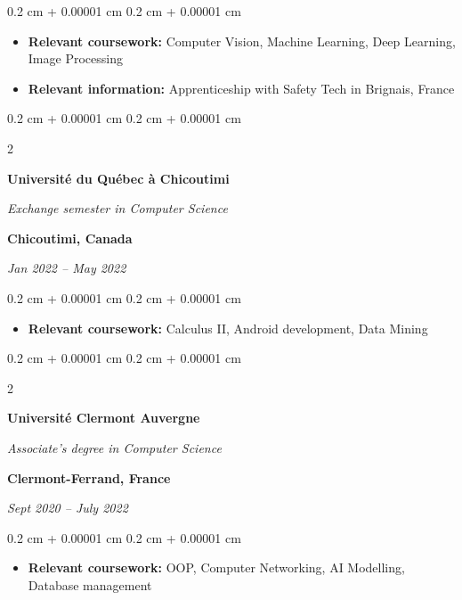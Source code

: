 \documentclass[10pt, letterpaper]{article}
\newenvironment{highlights}{
    \begin{itemize}[
        topsep=0.10 cm,
        parsep=0.10 cm,
        partopsep=0pt,
        itemsep=0pt,
        leftmargin=0.4 cm + 10pt
    ]
}{
    \end{itemize}
} %
\newenvironment{onecolentry}{
    \begin{adjustwidth}{
        0.2 cm + 0.00001 cm
    }{
        0.2 cm + 0.00001 cm
    }
}{
    \end{adjustwidth}
} %
\newenvironment{twocolentry}[2][]{
    \onecolentry
    \def\secondColumn{#2}
    \setcolumnwidth{\fill, 6 cm}
    \begin{paracol}{2}
}{
    \switchcolumn \raggedleft \secondColumn
    \end{paracol}
    \endonecolentry
} %
\begin{document}
        \vspace{0.2 cm}
        \begin{onecolentry}
            \begin{highlights}
                \item \textbf{Relevant coursework:} Computer Vision, Machine Learning, Deep Learning, Image Processing
                \item \textbf{Relevant information:} Apprenticeship with Safety Tech in Brignais, France
            \end{highlights}
        \end{onecolentry}

		\vspace{0.8 cm}
		\begin{twocolentry}{
			\textbf{Chicoutimi, Canada}

			\textit{Jan 2022 – May 2022}}
            \textbf{Université du Québec à Chicoutimi}

            \textit{Exchange semester in Computer Science}
        \end{twocolentry}

        \vspace{0.2 cm}
        \begin{onecolentry}
            \begin{highlights}
                \item \textbf{Relevant coursework:} Calculus II, Android development, Data Mining
            \end{highlights}
        \end{onecolentry}

		\vspace{0.8 cm}
		\begin{twocolentry}{
			\textbf{Clermont-Ferrand, France}

			\textit{Sept 2020 – July 2022}}
            \textbf{Université Clermont Auvergne}

            \textit{Associate's degree in Computer Science}
        \end{twocolentry}

        \vspace{0.2 cm}
        \begin{onecolentry}
            \begin{highlights}
                \item \textbf{Relevant coursework:} OOP, Computer Networking, AI Modelling, Database management
            \end{highlights}
        \end{onecolentry}
\end{document}
